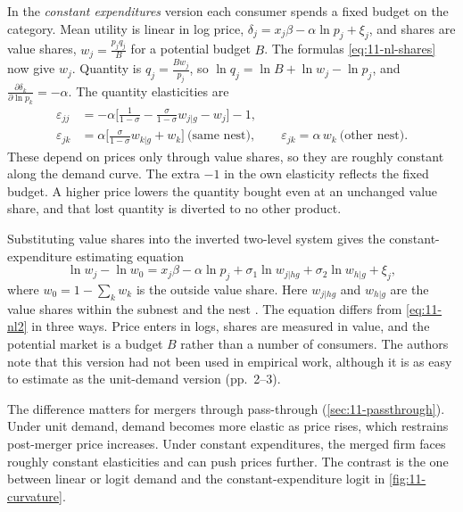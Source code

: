 In the \emph{constant expenditures} version each consumer spends a fixed budget on the category. Mean utility is
linear in log price, $\delta_j=x_j\beta-\alpha\ln p_j+\xi_j$, and shares are value shares,
$w_j=\frac{p_jq_j}{B}$ for a potential budget $B$. The formulas \eqref{eq:11-nl-shares} now give $w_j$. Quantity is
$q_j=\frac{Bw_j}{p_j}$, so $\ln q_j=\ln B+\ln w_j-\ln p_j$, and $\frac{\partial\delta_k}{\partial\ln
p_k}=-\alpha$. The quantity elasticities are
\begin{align}
\varepsilon_{jj}&=-\alpha\Big[\frac{1}{1-\sigma}-\frac{\sigma}{1-\sigma}w_{j|g}-w_j\Big]-1,\label{eq:11-ce-own}\\
\varepsilon_{jk}&=\alpha\Big[\frac{\sigma}{1-\sigma}w_{k|g}+w_k\Big]\ \text{(same nest)},\qquad
\varepsilon_{jk}=\alpha\,w_k\ \text{(other nest)}.\nonumber
\end{align}
These depend on prices only through value shares, so they are roughly constant along the demand curve. The extra
$-1$ in the own elasticity reflects the fixed budget. A higher price lowers the quantity bought even at an unchanged
value share, and that lost quantity is diverted to no other product.

Substituting value shares into the inverted two-level system gives the constant-expenditure estimating equation
\begin{equation}\label{eq:11-ce-est}
\ln w_j-\ln w_0=x_j\beta-\alpha\ln p_j+\sigma_1\ln w_{j|hg}+\sigma_2\ln w_{h|g}+\xi_j,
\end{equation}
where $w_0=1-\sum_kw_k$ is the outside value share. Here $w_{j|hg}$ and $w_{h|g}$ are the value shares within the
subnest and the nest \citep[eq.~(10)]{BjornerstedtVerboven2013}. The equation differs from \eqref{eq:11-nl2} in three ways.
Price enters in logs, shares are measured in value, and the potential market is a budget $B$ rather than a number of
consumers. The authors note that this version had not been used in empirical work, although it is as easy to
estimate as the unit-demand version (pp.~2--3).

The difference matters for mergers through pass-through (\cref{sec:11-passthrough}). Under unit demand, demand becomes
more elastic as price rises, which restrains post-merger price increases. Under constant expenditures, the merged
firm faces roughly constant elasticities and can push prices further. The contrast is the one between linear or
logit demand and the constant-expenditure logit in \cref{fig:11-curvature}.

